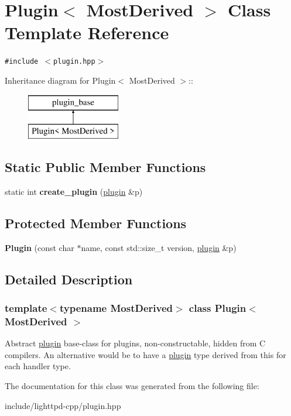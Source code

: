 \hypertarget{classPlugin}{
\section{Plugin$<$ MostDerived $>$ Class Template Reference}
\label{classPlugin}
}
{\tt \#include $<$plugin.hpp$>$}

Inheritance diagram for Plugin$<$ MostDerived $>$::\begin{figure}[H]
\begin{center}
\leavevmode
\includegraphics[height=2cm]{classPlugin}
\end{center}
\end{figure}
\subsection*{Static Public Member Functions}
\begin{CompactItemize}
\item 
\hypertarget{classPlugin_37ff1cb61a63833adee3cd4c0df42848}{
static int \textbf{create\_\-plugin} (\hyperlink{structplugin}{plugin} \&p)}
\label{classPlugin_37ff1cb61a63833adee3cd4c0df42848}

\end{CompactItemize}
\subsection*{Protected Member Functions}
\begin{CompactItemize}
\item 
\hypertarget{classPlugin_3e13aa67b9728e5accd83c41b9129b57}{
\textbf{Plugin} (const char $\ast$name, const std::size\_\-t version, \hyperlink{structplugin}{plugin} \&p)}
\label{classPlugin_3e13aa67b9728e5accd83c41b9129b57}

\end{CompactItemize}


\subsection{Detailed Description}
\subsubsection*{template$<$typename MostDerived$>$ class Plugin$<$ MostDerived $>$}

Abstract \hyperlink{structplugin}{plugin} base-class for plugins, non-constructable, hidden from C compilers. An alternative would be to have a \hyperlink{structplugin}{plugin} type derived from this for each handler type. 

The documentation for this class was generated from the following file:\begin{CompactItemize}
\item 
include/lighttpd-cpp/plugin.hpp\end{CompactItemize}
